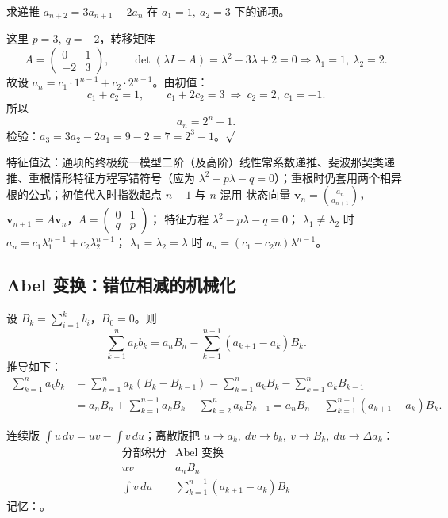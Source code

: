 \begin{explore}
\begin{example}
求递推 $a_{n+2}=3a_{n+1}-2a_n$ 在 $a_1=1,\ a_2=3$ 下的通项。
\end{example}
\begin{solution}
这里 $p=3,\ q=-2$，转移矩阵
\[
  A=\begin{pmatrix}0&1\\-2&3\end{pmatrix},\qquad
  \det(\lambda I-A)=\lambda^2-3\lambda+2=0
  \Rightarrow \lambda_1=1,\ \lambda_2=2 .
\]
故设 $a_n=c_1\cdot1^{n-1}+c_2\cdot2^{n-1}$。由初值：
\[
  c_1+c_2=1,\qquad c_1+2c_2=3
  \ \Rightarrow\ c_2=2,\ c_1=-1 .
\]
所以
\[
  a_n=2^n-1 .
\]
检验：$a_3=3a_2-2a_1=9-2=7=2^3-1$。$\surd$
\end{solution}

\begin{conccard}[二级]{特征值法：通项的终极统一模型}{二阶（及高阶）线性常系数递推、斐波那契类递推、重根情形}{特征方程写错符号（应为 $\lambda^2-p\lambda-q=0$）；重根时仍套用两个相异根的公式；初值代入时指数起点 $n-1$ 与 $n$ 混用}
状态向量 $\mathbf v_n=\binom{a_n}{a_{n+1}}$，$\mathbf v_{n+1}=A\mathbf v_n$，$A=\begin{pmatrix}0&1\\q&p\end{pmatrix}$；
特征方程 $\lambda^2-p\lambda-q=0$；
$\lambda_1\ne\lambda_2$ 时 $a_n=c_1\lambda_1^{n-1}+c_2\lambda_2^{n-1}$；
$\lambda_1=\lambda_2=\lambda$ 时 $a_n=(c_1+c_2n)\lambda^{n-1}$。
\end{conccard}

\subsection{Abel 变换：错位相减的机械化}


设 $B_k=\sum_{i=1}^kb_i$，$B_0=0$。则
\[
  \sum_{k=1}^na_kb_k=a_nB_n-\sum_{k=1}^{n-1}(a_{k+1}-a_k)B_k .
\]
推导如下：
\[
\begin{aligned}
  \sum_{k=1}^na_kb_k
  &=\sum_{k=1}^na_k(B_k-B_{k-1})
  =\sum_{k=1}^na_kB_k-\sum_{k=1}^na_kB_{k-1}\\
  &=a_nB_n+\sum_{k=1}^{n-1}a_kB_k-\sum_{k=2}^{n}a_kB_{k-1}
  =a_nB_n-\sum_{k=1}^{n-1}(a_{k+1}-a_k)B_k .
\end{aligned}
\]

连续版 $\int u\,dv=uv-\int v\,du$；离散版把 $u\to a_k,\ dv\to b_k,\ v\to B_k,\ du\to \Delta a_k$：
\[
\begin{array}{c|c}
  \text{分部积分} & \text{Abel 变换} \\ \hline
  uv & a_nB_n \\
  \displaystyle\int v\,du & \displaystyle\sum_{k=1}^{n-1}(a_{k+1}-a_k)B_k
\end{array}
\]
记忆：。


\end{explore}
